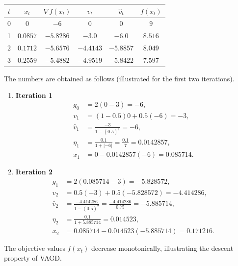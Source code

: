 \documentclass{article}
\newcommand{\grad}{\nabla}
\begin{document}
\begin{center}
\begin{tabular}{c|c|c|c|c|c}
$t$ & $x_{t}$ & $\grad f(x_{t})$ & $v_{t}$ & $\hat v_{t}$ & $f(x_{t})$\\\hline
0 & $0$ & $-6$ & $0$ & $0$ & $9$\\
1 & $0.0857$ & $-5.8286$ & $-3.0$ & $-6.0$ & $8.516$\\
2 & $0.1712$ & $-5.6576$ & $-4.4143$ & $-5.8857$ & $8.049$\\
3 & $0.2559$ & $-5.4882$ & $-4.9519$ & $-5.8422$ & $7.597$\\
\end{tabular}
\end{center}
The numbers are obtained as follows (illustrated for the first two iterations).

\begin{enumerate}[label=\textbf{Iter \arabic*:}, leftmargin=*]
\item \textbf{Iteration 1}
\[
\begin{aligned}
g_{0}&=2(0-3)=-6,\\
v_{1}&=(1-0.5)0+0.5(-6)=-3,\\
\hat v_{1}&=\frac{-3}{1-(0.5)^{1}}=-6,\\
\eta_{1}&=\frac{0.1}{1+|{-6}|}= \frac{0.1}{7}=0.0142857,\\
x_{1}&=0-0.0142857(-6)=0.085714.
\end{aligned}
\]
\item \textbf{Iteration 2}
\[
\begin{aligned}
g_{1}&=2(0.085714-3)=-5.828572,\\
v_{2}&=0.5(-3)+0.5(-5.828572)=-4.414286,\\
\hat v_{2}&=\frac{-4.414286}{1-(0.5)^{2}}=
\frac{-4.414286}{0.75}=-5.885714,\\
\eta_{2}&=\frac{0.1}{1+5.885714}=0.014523,\\
x_{2}&=0.085714-0.014523(-5.885714)=0.171216.
\end{aligned}
\]
\end{enumerate}
The objective values $f(x_{t})$ decrease monotonically, illustrating the
descent property of VAGD.

\newpage
\end{document}
